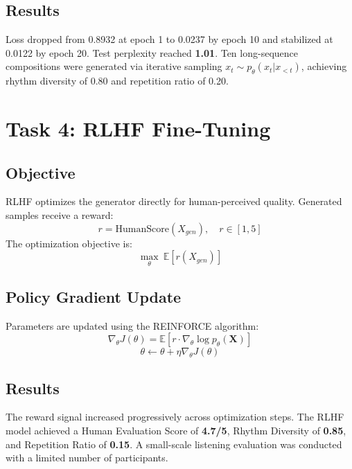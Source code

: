 \documentclass[conference]{IEEEtran}
\begin{document}
\subsection{Results}

Loss dropped from 0.8932 at epoch 1 to 0.0237 by epoch 10 and stabilized at 0.0122 by epoch 20. Test perplexity reached \textbf{1.01}. Ten long-sequence compositions were generated via iterative sampling $x_t \sim p_\theta(x_t | x_{<t})$, achieving rhythm diversity of 0.80 and repetition ratio of 0.20.

\section{Task 4: RLHF Fine-Tuning}

\subsection{Objective}

RLHF optimizes the generator directly for human-perceived quality. Generated samples receive a reward:
\begin{equation}
r = \text{HumanScore}(X_{gen}), \quad r \in [1, 5]
\end{equation}
The optimization objective is:
\begin{equation}
\max_\theta\ \mathbb{E}[r(X_{gen})]
\end{equation}

\subsection{Policy Gradient Update}

Parameters are updated using the REINFORCE algorithm:
\begin{equation}
\nabla_\theta J(\theta) = \mathbb{E}\left[r \cdot \nabla_\theta \log p_\theta(\mathbf{X})\right]
\end{equation}
\begin{equation}
\theta \leftarrow \theta + \eta \nabla_\theta J(\theta)
\end{equation}

\subsection{Results}

The reward signal increased progressively across optimization steps. The RLHF model achieved a Human Evaluation Score of \textbf{4.7/5}, Rhythm Diversity of \textbf{0.85}, and Repetition Ratio of \textbf{0.15}. A small-scale listening evaluation was conducted with a limited number of participants.
\end{document}
